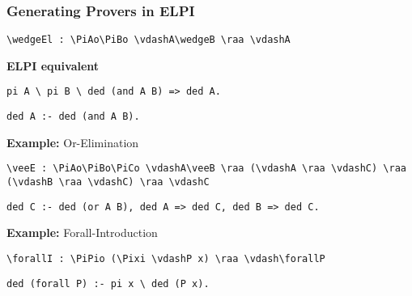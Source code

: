 \begin{frame}[fragile]
    \frametitle{Generating Provers in ELPI}
     \lstinline[language=MMT]|\wedgeEl : \PiAo\PiBo \vdashA\wedgeB \raa \vdashA|

    \vspace{1.0em}
    \textbf{ELPI equivalent}

    \vspace{0.5em}
     \lstinline[language=ELPI]|pi A \ pi B \ ded (and A B) => ded A.|

    \vspace{0.5em}
     \lstinline[language=ELPI]|ded A :- ded (and A B).|

% 
    \vspace{1.5em}
    \pause

    \begin{block}{{\bfseries Example:} Or-Elimination}
    \begin{minipage}{0.85\textwidth}
    \lstinline[keepspaces=true,language=MMT]|\veeE : \PiAo\PiBo\PiCo \vdashA\veeB \raa (\vdashA \raa \vdashC) \raa (\vdashB \raa \vdashC) \raa \vdashC|
\end{minipage}

    \vspace{0.5em}
    \lstinline[language=ELPI,keepspaces=true]|ded C :- ded (or A B), ded A => ded C, ded B => ded C.|
    \end{block}

    \vspace{0.5em}

    \begin{block}{{\bfseries Example:} Forall-Introduction}
    \begin{minipage}{0.85\textwidth}
        \lstinline[keepspaces=true,language=MMT]|\forallI : \PiPio (\Pixi \vdashP x) \raa \vdash\forallP|
    \end{minipage}

    \vspace{0.5em}
    \lstinline[language=ELPI,keepspaces=true]|ded (forall P) :- pi x \ ded (P x).|
    \vspace{0.5em}
    \end{block}
\end{frame}

